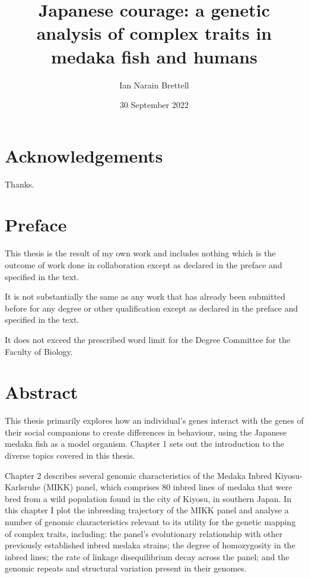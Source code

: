 \documentclass[
]{book}
\title{Japanese courage: a genetic analysis of complex traits in medaka fish and humans}
\author{Ian Narain Brettell}
\date{30 September 2022}
\begin{document}
\maketitle

{
\setcounter{tocdepth}{1}
\tableofcontents
}
\hypertarget{acknowledgements}{%
\chapter*{Acknowledgements}\label{acknowledgements}}

Thanks.

\hypertarget{preface}{%
\chapter*{Preface}\label{preface}}

This thesis is the result of my own work and includes nothing which is the outcome of work done in collaboration except as declared in the preface and specified in the text.

It is not substantially the same as any work that has already been submitted before for any degree or other qualification except as declared in the preface and specified in the text.

It does not exceed the prescribed word limit for the Degree Committee for the Faculty of Biology.

\hypertarget{abstract}{%
\chapter*{Abstract}\label{abstract}}

This thesis primarily explores how an individual's genes interact with the genes of their social companions to create differences in behaviour, using the Japanese medaka fish as a model organism. Chapter 1 sets out the introduction to the diverse topics covered in this thesis.

Chapter 2 describes several genomic characteristics of the Medaka Inbred Kiyosu-Karlsruhe (MIKK) panel, which comprises 80 inbred lines of medaka that were bred from a wild population found in the city of Kiyosu, in southern Japan. In this chapter I plot the inbreeding trajectory of the MIKK panel and analyse a number of genomic characteristics relevant to its utility for the genetic mapping of complex traits, including: the panel's evolutionary relationship with other previously established inbred medaka strains; the degree of homozygosity in the inbred lines; the rate of linkage disequilibrium decay across the panel; and the genomic repeats and structural variation present in their genomes.
\end{document}
